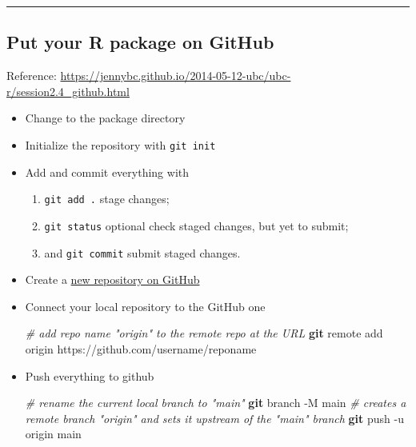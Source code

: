 \documentclass[
]{book}
\newenvironment{Shaded}{\begin{snugshade}}{\end{snugshade}}
\newcommand{\AttributeTok}[1]{\textcolor[rgb]{0.13,0.29,0.53}{#1}}
\newcommand{\CommentTok}[1]{\textcolor[rgb]{0.56,0.35,0.01}{\textit{#1}}}
\newcommand{\FunctionTok}[1]{\textcolor[rgb]{0.13,0.29,0.53}{\textbf{#1}}}
\newcommand{\NormalTok}[1]{#1}
\providecommand{\tightlist}{%
  \setlength{\itemsep}{0pt}\setlength{\parskip}{0pt}}
\begin{document}
\begin{center}\rule{0.5\linewidth}{0.5pt}\end{center}

\subsection*{Put your R package on GitHub}\label{put-your-r-package-on-github}

Reference: \url{https://jennybc.github.io/2014-05-12-ubc/ubc-r/session2.4_github.html}

\begin{itemize}
\item
  Change to the package directory
\item
  Initialize the repository with \texttt{git\ init}
\item
  Add and commit everything with

  \begin{enumerate}
  \def\labelenumi{\arabic{enumi}.}
  \tightlist
  \item
    \texttt{git\ add\ .} stage changes;
  \item
    \texttt{git\ status} optional check staged changes, but yet to submit;
  \item
    and \texttt{git\ commit} submit staged changes.
  \end{enumerate}
\item
  Create a \href{https://github.com/new}{new repository on GitHub}
\item
  Connect your local repository to the GitHub one

\begin{Shaded}
\begin{Highlighting}[]
\CommentTok{\# add repo name "origin" to the remote repo at the URL}
\FunctionTok{git}\NormalTok{ remote add origin https://github.com/username/reponame}
\end{Highlighting}
\end{Shaded}
\item
  Push everything to github

\begin{Shaded}
\begin{Highlighting}[]
\CommentTok{\# rename the current local branch to "main"}
\FunctionTok{git}\NormalTok{ branch }\AttributeTok{{-}M}\NormalTok{ main}
\CommentTok{\# creates a remote branch "origin" and sets it upstream of the "main" branch}
\FunctionTok{git}\NormalTok{ push }\AttributeTok{{-}u}\NormalTok{ origin main}
\end{Highlighting}
\end{Shaded}
\end{itemize}
\end{document}
